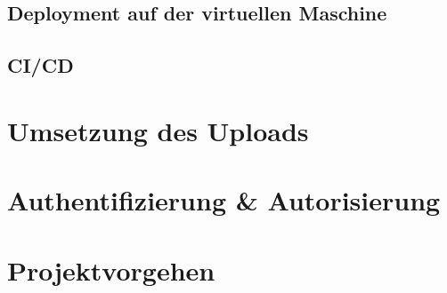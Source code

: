     \subsection{Deployment auf der virtuellen Maschine}
    

    \subsection{CI/CD}
    

\section{Umsetzung des Uploads}


\setauthor{\firstauthor}
\section{Authentifizierung \& Autorisierung}


\setauthor{\secondauthor}
\section{Projektvorgehen}
